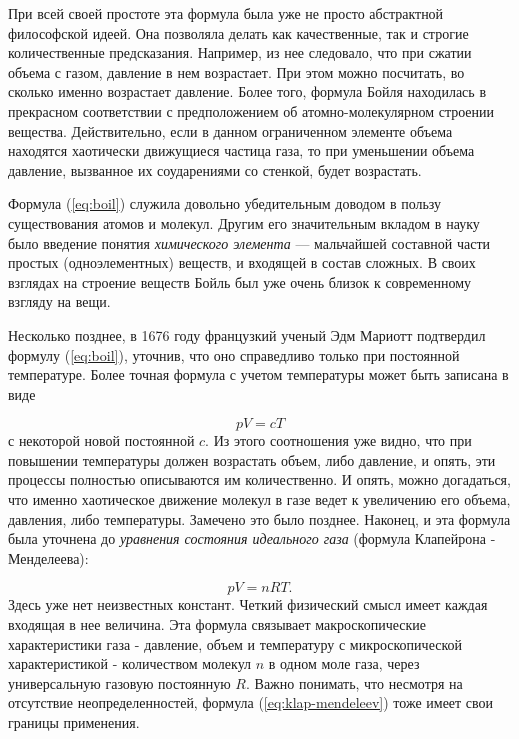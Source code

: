 При всей своей простоте эта формула была уже не просто абстрактной философской идеей.
Она позволяла делать как качественные, так и строгие количественные предсказания.
Например, из нее следовало, что при сжатии объема с газом, давление в нем возрастает.
При этом можно посчитать, во сколько именно возрастает давление.
Более того, формула Бойля находилась в прекрасном соответствии с предположением об атомно-молекулярном строении вещества.
Действительно, если в данном ограниченном элементе объема находятся хаотически движущиеся частица газа, то при уменьшении объема давление, вызванное их соударениями со стенкой, будет возрастать.

Формула (\ref{eq:boil}) служила довольно убедительным доводом в пользу существования атомов и молекул.
Другим его значительным вкладом в науку было введение понятия \textit{химического элемента} — мальчайшей составной части простых (одноэлементных) веществ, и входящей в состав сложных.
В своих взглядах на строение веществ Бойль был уже очень близок к современному взгляду на вещи. 

Несколько позднее, в 1676 году французкий ученый Эдм Мариотт подтвердил формулу (\ref{eq:boil}), уточнив, что оно справедливо только при постоянной температуре.
Более точная формула с учетом температуры может быть записана в виде

\begin{equation}\label{eq:boil-mariott}
pV = cT
\end{equation}
с некоторой новой постоянной $c$. 
Из этого соотношения уже видно, что при повышении температуры должен возрастать объем, либо давление, и опять, эти процессы полностью описываются им количественно.
И опять, можно догадаться, что именно хаотическое движение молекул в газе ведет к увеличению его объема, давления, либо температуры.
Замечено это было позднее.
Наконец, и эта формула была уточнена до \textit{уравнения состояния идеального газа} (формула Клапейрона - Менделеева):

\begin{equation}\label{eq:klap-mendeleev}
pV = nRT.
\end{equation}
Здесь уже нет неизвестных констант.
Четкий физический смысл имеет каждая входящая в нее величина.
Эта формула связывает макроскопические характеристики газа - давление, объем и температуру с микроскопической характеристикой - количеством молекул $n$ в одном моле газа, через универсальную газовую постоянную $R$.
Важно понимать, что несмотря на отсутствие неопределенностей, формула (\ref{eq:klap-mendeleev}) тоже имеет свои границы применения.


